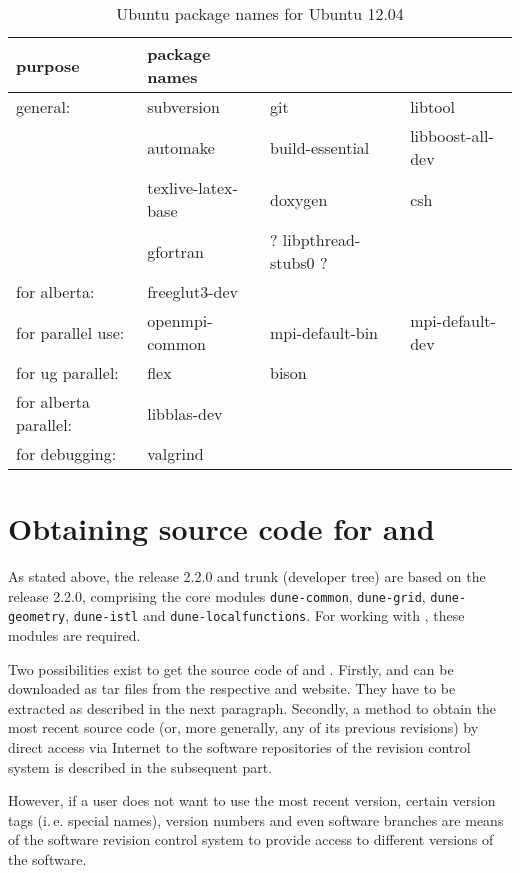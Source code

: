 \begin{table}
\centering
\caption{Ubuntu package names for Ubuntu 12.04}
\begin{tabular}{llll}
\toprule
\textbf{purpose} & \textbf{package names} \\
\midrule
general: & subversion & git & libtool \\
& automake & build-essential & libboost-all-dev \\
& texlive-latex-base & doxygen & csh\\
& gfortran & ? libpthread-stubs0 ?\\
\midrule
for alberta: & freeglut3-dev &  \\
\midrule
for parallel use: & openmpi-common & mpi-default-bin & mpi-default-dev \\
\midrule
for ug parallel: & flex & bison & \\
\midrule
for alberta parallel: & libblas-dev &\\
\midrule
for debugging: & valgrind &\\
\bottomrule
\end{tabular}
\label{tbl:ubuntu-pkg}
\end{table}

\section{Obtaining source code for \Dune and \Dumux}
As stated above, the \Dumux release 2.2.0 and trunk (developer tree) are based on the \Dune release 2.2.0, 
comprising the core modules \texttt{dune-common}, \texttt{dune-grid}, \texttt{dune-geometry}, \texttt{dune-istl} and \texttt{dune-localfunctions}.
For working with \Dumux, these modules are required.

Two possibilities exist to get the source code of \Dune and \Dumux.
Firstly, \Dune and \Dumux can be downloaded as tar files from the respective \Dune and \Dumux website. They have to be extracted as described in the next paragraph.
Secondly, a method to obtain the most recent source code (or, more generally, any of its previous revisions) by direct access 
via Internet to the software repositories of the revision control system is described in the subsequent part. 

However, if a user does not want to use the most recent version,
certain version tags (i.\,e. special names), version numbers and even software branches are means 
of the software revision control system to provide access to different versions of the software.

